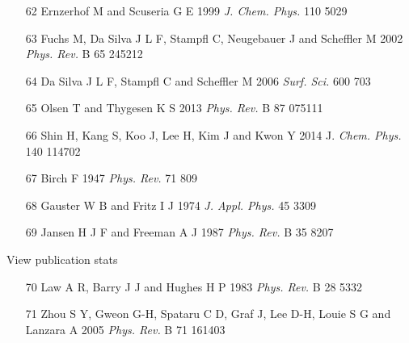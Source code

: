 \documentclass{article}
\begin{document}
\begin{itemize}
\item 
[62] Ernzerhof M and Scuseria G E 1999 \textit{J. Chem. Phys.} 110 5029

\item 
[63] Fuchs M, Da Silva J L F, Stampfl C, Neugebauer J and Scheffler M 2002 \textit{Phys. Rev.} B 65 245212

\item 
[64] Da Silva J L F, Stampfl C and Scheffler M 2006 \textit{Surf. Sci.} 600 703

\item 
[65] Olsen T and Thygesen K S 2013 \textit{Phys. Rev.} B 87 075111

\item 
[66] Shin H, Kang S, Koo J, Lee H, Kim J and Kwon Y 2014 J. \textit{Chem. Phys.} 140 114702

\item 
[67] Birch F 1947 \textit{Phys. Rev.} 71 809

\item 
[68] Gauster W B and Fritz I J 1974 \textit{J. Appl. Phys.} 45 3309

\item 
[69] Jansen H J F and Freeman A J 1987 \textit{Phys. Rev.} B 35 8207

\end{itemize}

View publication stats
\begin{itemize}
\item 
[70] Law A R, Barry J J and Hughes H P 1983 \textit{Phys. Rev.} B 28 5332

\item 
[71] Zhou S Y, Gweon G-H, Spataru C D, Graf J, Lee D-H, Louie S G and Lanzara A 2005 \textit{Phys. Rev.} B 71 161403

\end{itemize}
\end{document}
